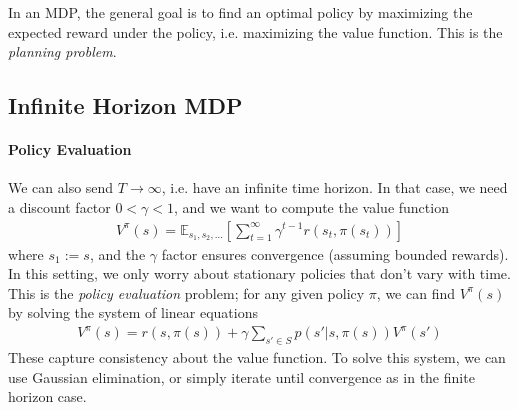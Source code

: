 \documentclass[12pt]{article}
\begin{document}
In an MDP, the general goal is to find an optimal policy  by maximizing the expected reward under the policy, i.e. maximizing the value function. This is the \emph{planning problem}.








\subsection{Infinite Horizon MDP}

\paragraph{Policy Evaluation}

We can also send $T \to \infty$, i.e. have an infinite time horizon. In that case, we need a discount factor $0 < \gamma < 1$, and we want to compute the value function
\begin{align}
V^\pi(s) = \mathbb{E}_{s_1,s_2,\ldots}\left[\sum_{t=1}^\infty \gamma^{t-1} r(s_t, \pi(s_t))\right]\end{align}
where $s_1 := s$, and the $\gamma$ factor ensures convergence (assuming bounded rewards). In this setting, we only worry about stationary policies that don't vary with time.
This is the \emph{policy evaluation} problem; for any given policy $\pi$, we can find $V^\pi(s)$ by solving the system of linear equations
\begin{align}V^\pi(s) = r(s, \pi(s)) + \gamma \sum_{s' \in S} p(s' | s, \pi(s)) V^\pi(s') \label{eq:bellman_policy_eval} \end{align}
These capture consistency about the value function. To solve this system, we can use Gaussian elimination, or simply iterate until convergence as in the finite horizon case.
\end{document}
